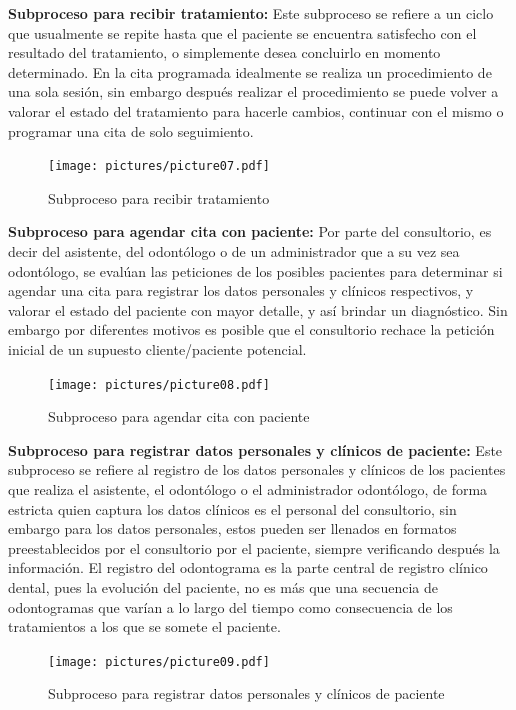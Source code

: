 \noindent\textbf{Subproceso para recibir tratamiento:} Este subproceso se refiere a un ciclo que usualmente se repite hasta que el paciente se encuentra satisfecho con el resultado del tratamiento, o simplemente desea concluirlo en momento determinado. En la cita programada idealmente se realiza un procedimiento de una sola sesión, sin embargo después realizar el procedimiento se puede volver a valorar el estado del tratamiento para hacerle cambios, continuar con el mismo o programar una cita de solo seguimiento. 

\begin{figure}[H]
\centering
\centerline{\texttt{[image: pictures/picture07.pdf]}}
\caption{Subproceso para recibir tratamiento}
\end{figure}

\noindent\textbf{Subproceso para agendar cita con paciente:} Por parte del consultorio, es decir del asistente, del odontólogo o de un administrador que a su vez sea odontólogo, se evalúan las peticiones de los posibles pacientes para determinar si agendar una cita para registrar los datos personales y clínicos respectivos, y valorar el estado del paciente con mayor detalle, y así brindar un diagnóstico. Sin embargo por diferentes motivos es posible que el consultorio rechace la petición inicial de un supuesto cliente/paciente potencial.

\begin{figure}[H]
\centering
\centerline{ \texttt{[image: pictures/picture08.pdf]}}
\caption{Subproceso para agendar cita con paciente}
\end{figure}

\noindent\textbf{Subproceso para registrar datos personales y clínicos de paciente:} Este subproceso se refiere al registro de los datos personales y clínicos de los pacientes que realiza el asistente, el odontólogo o el administrador odontólogo, de forma estricta quien captura los datos clínicos es el personal del consultorio, sin embargo para los datos personales, estos pueden ser llenados en formatos preestablecidos por el consultorio por el paciente, siempre verificando después la información. El registro del odontograma es la parte central de registro clínico dental, pues la evolución del paciente, no es más que una secuencia de odontogramas que varían a lo largo del tiempo como consecuencia de los tratamientos a los que se somete el paciente.

\begin{figure}[H]
\centering
\centerline{\texttt{[image: pictures/picture09.pdf]}}
\caption{Subproceso para registrar datos personales y clínicos de paciente}
\end{figure}

